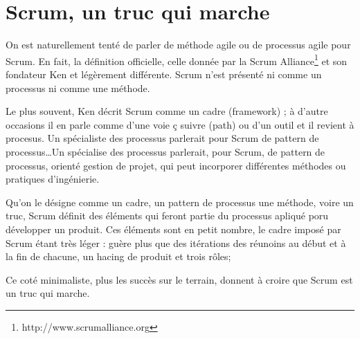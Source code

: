 \documentclass[12pt,a4paper,openany]{article}
\begin{document}
	\maketitle
	\section*{Scrum, un truc qui marche}
	On est naturellement tenté de parler de méthode agile ou de processus agile pour Scrum. En fait, la définition officielle, celle donnée par la Scrum Alliance\footnote{http://www.scrumalliance.org} et son fondateur
	Ken  et légèrement différente. Scrum n'est présenté ni comme un processus ni comme une méthode.

	Le plus souvent, Ken  décrit Scrum comme un cadre (framework) ; à d'autre occasions il en parle comme d'une voie ç suivre (path) ou d'un outil et il revient à procesus. 
	Un spécialiste des processus parlerait pour Scrum de pattern de processus\ldots Un spécialise des processus parlerait, pour Scrum, de pattern de processus, orienté gestion de projet,
	qui peut incorporer différentes méthodes ou pratiques d'ingénierie. 

	Qu'on le désigne comme un cadre, un pattern de processus une méthode, voire un truc, Scrum définit des éléments qui feront partie du processus apliqué poru développer un produit. Ces éléments
	sont en petit nombre, le cadre imposé par Scrum étant très léger : guère plus que des itérations des réunoins au début et à la fin de chacune, un hacing de produit et trois rôles;

	Ce coté minimaliste, plus les succès sur le terrain, donnent à croire que Scrum est un truc qui marche.
\end{document}
